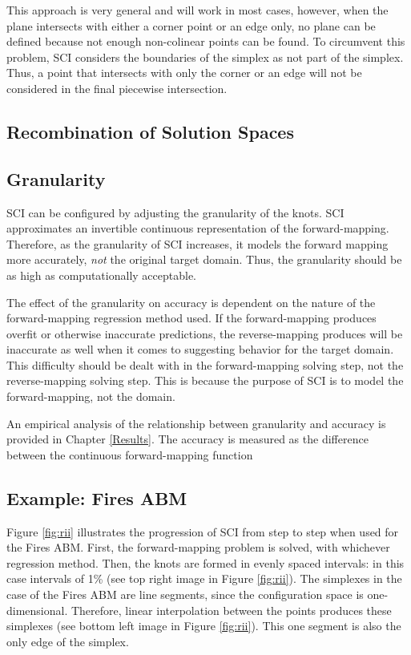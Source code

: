 This approach is very general and will work in most cases, however, when the plane intersects with either a corner point or an edge only, no plane can be defined because not enough non-colinear points can be found.
To circumvent this problem, SCI considers the boundaries of the simplex as not part of the simplex.
Thus, a point that intersects with only the corner or an edge will not be considered in the final piecewise intersection.


\subsection{Recombination of Solution Spaces}

\subsection{Granularity}

SCI can be configured by adjusting the granularity of the knots.
SCI approximates an invertible continuous representation of the forward-mapping.
Therefore, as the granularity of SCI increases, it models the forward mapping more accurately, \textit{not} the original target domain.
Thus, the granularity should be as high as computationally acceptable.

The effect of the granularity on accuracy is dependent on the nature of the forward-mapping regression method used.
If the forward-mapping produces overfit or otherwise inaccurate predictions, the reverse-mapping produces will be inaccurate as well when it comes to suggesting behavior for the target domain.
This difficulty should be dealt with in the forward-mapping solving step, not the reverse-mapping solving step.
This is because the purpose of SCI is to model the forward-mapping, not the domain.

An empirical analysis of the relationship between granularity and accuracy is provided in Chapter \ref{Results}.
The accuracy is measured as the difference between the continuous forward-mapping function


\subsection{Example: Fires ABM}

Figure \ref{fig:rii} illustrates the progression of SCI from step to step when used for the Fires ABM.
First, the forward-mapping problem is solved, with whichever regression method.
Then, the knots are formed in evenly spaced intervals: in this case intervals of 1\% (see top right image in Figure \ref{fig:rii}).
The simplexes in the case of the Fires ABM are line segments, since the configuration space is one-dimensional.
Therefore, linear interpolation between the points produces these simplexes (see bottom left image in Figure \ref{fig:rii}).
This one segment is also the only edge of the simplex.

